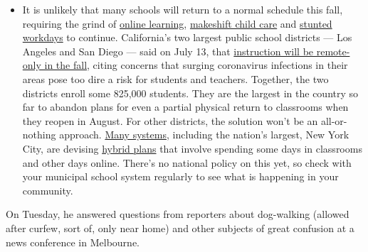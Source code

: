 \begin{itemize}
  \begin{itemize}
  \tightlist
  \item
    It is unlikely that many schools will return to a normal schedule
    this fall, requiring the grind of
    \href{https://www.nytimes3xbfgragh.onion/2020/06/05/us/coronavirus-education-lost-learning.html?action=click\&pgtype=Article\&state=default\&region=MAIN_CONTENT_3\&context=storylines_faq}{online
    learning},
    \href{https://www.nytimes3xbfgragh.onion/2020/05/29/us/coronavirus-child-care-centers.html?action=click\&pgtype=Article\&state=default\&region=MAIN_CONTENT_3\&context=storylines_faq}{makeshift
    child care} and
    \href{https://www.nytimes3xbfgragh.onion/2020/06/03/business/economy/coronavirus-working-women.html?action=click\&pgtype=Article\&state=default\&region=MAIN_CONTENT_3\&context=storylines_faq}{stunted
    workdays} to continue. California's two largest public school
    districts --- Los Angeles and San Diego --- said on July 13, that
    \href{https://www.nytimes3xbfgragh.onion/2020/07/13/us/lausd-san-diego-school-reopening.html?action=click\&pgtype=Article\&state=default\&region=MAIN_CONTENT_3\&context=storylines_faq}{instruction
    will be remote-only in the fall}, citing concerns that surging
    coronavirus infections in their areas pose too dire a risk for
    students and teachers. Together, the two districts enroll some
    825,000 students. They are the largest in the country so far to
    abandon plans for even a partial physical return to classrooms when
    they reopen in August. For other districts, the solution won't be an
    all-or-nothing approach.
    \href{https://bioethics.jhu.edu/research-and-outreach/projects/eschool-initiative/school-policy-tracker/}{Many
    systems}, including the nation's largest, New York City, are
    devising
    \href{https://www.nytimes3xbfgragh.onion/2020/06/26/us/coronavirus-schools-reopen-fall.html?action=click\&pgtype=Article\&state=default\&region=MAIN_CONTENT_3\&context=storylines_faq}{hybrid
    plans} that involve spending some days in classrooms and other days
    online. There's no national policy on this yet, so check with your
    municipal school system regularly to see what is happening in your
    community.
  \end{itemize}
\end{itemize}

On Tuesday, he answered questions from reporters about dog-walking
(allowed after curfew, sort of, only near home) and other subjects of
great confusion at a news conference in Melbourne.

